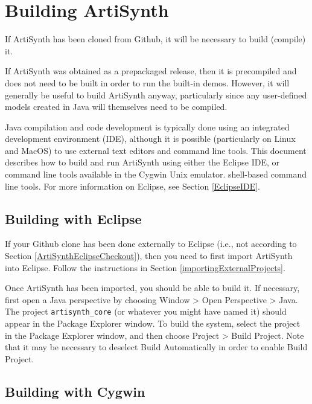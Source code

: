 \section{Building ArtiSynth}
\label{Building}

If ArtiSynth has been cloned from Github, it will be necessary to
build (compile) it. 

If ArtiSynth was obtained as a prepackaged release, then it is
precompiled and does not need to be built in order to run the built-in
demos. However, it will generally be useful to build ArtiSynth anyway,
particularly since any user-defined models created in Java will
themselves need to be compiled.

Java compilation and code development is typically done using an
integrated development environment (IDE), although it is possible
(particularly on Linux and MacOS) to use external text editors and
command line tools. This document describes how to build and run
ArtiSynth using either the Eclipse IDE, or
\ifWindows
command line tools available in the Cygwin Unix emulator.
\else
shell-based command line tools.
\fi
For more information on Eclipse, see Section \ref{EclipseIDE}.

\subsection{Building with Eclipse}
\label{BuildingWithEclipse}

If your Github clone has been done externally to Eclipse (i.e.,
not according to Section \ref{ArtiSynthEclipseCheckout}), then you
need to first import ArtiSynth into Eclipse. Follow the instructions
in Section \ref{importingExternalProjects}.

Once ArtiSynth has been imported, you should be able to build it.  If
necessary, first open a Java perspective by choosing {\sf Window >
Open Perspective > Java}. The project {\tt artisynth\_core} (or
whatever you might have named it) should appear in the {\sf Package
Explorer} window. To build the system, select the project in the {\sf
Package Explorer} window, and then choose {\sf Project > Build
Project}. Note that it may be necessary to deselect {\sf Build
Automatically} in order to enable {\sf Build Project}.

\ifWindows
\subsection{Building with Cygwin}
\label{BuildingWithCygwin}

